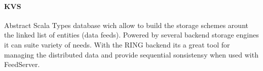 \paragraph{KVS}
Abstract Scala Types database wich allow to build the storage schemes arount the linked list of entities (data feeds).
Powered by several backend storage engines it can suite variety of needs.
With the RING backend its a great tool for managing the distributed data and provide sequential sonsistensy when used with FeedServer.

